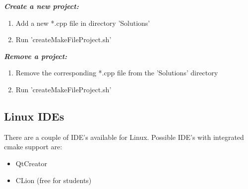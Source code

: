 \documentclass[]{article}
\begin{document}
\textit{\textbf{Create a new project:}}
\begin{enumerate}
\item Add a new *.cpp file in directory 'Solutions'
\item Run 'createMakeFileProject.sh' \\
\end{enumerate}

\textit{\textbf{Remove a project:}}
\begin{enumerate}
\item Remove the corresponding *.cpp file from the 'Solutions' directory
\item Run 'createMakeFileProject.sh' \\
\end{enumerate}

\subsection{Linux IDEs}

There are a couple of IDE's available for Linux. Possible IDE's with integrated cmake support are: 
\begin{itemize}
\item QtCreator
\item CLion (free for students)
\end{itemize}
\end{document}
